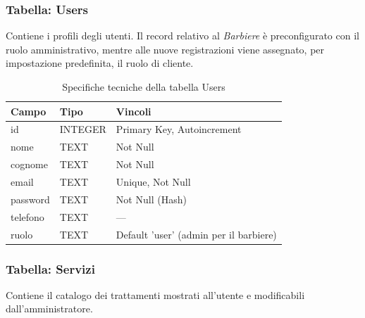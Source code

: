 \documentclass[12pt,a4paper]{article}
\begin{document}
\subsubsection{Tabella: Users}
Contiene i profili degli utenti. Il record relativo al \textit{Barbiere} è preconfigurato con il ruolo amministrativo, mentre alle nuove registrazioni viene assegnato, per impostazione predefinita, il ruolo di cliente.

\begin{table}[h]
\centering

\vspace{1cm}

\begin{tabular}{lll} %
    \toprule
    \textbf{Campo} & \textbf{Tipo} & \textbf{Vincoli} \\ 
    \midrule
    id             & INTEGER       & Primary Key, Autoincrement \\ 
    nome           & TEXT          & Not Null \\ 
    cognome        & TEXT          & Not Null \\ 
    email          & TEXT          & Unique, Not Null \\ 
    password       & TEXT          & Not Null (Hash) \\
    telefono       & TEXT          & --- \\ 
    ruolo          & TEXT          & Default 'user' (admin per il barbiere) \\ 
    \bottomrule
\end{tabular}
\caption{Specifiche tecniche della tabella Users}
\end{table}


\subsubsection{Tabella: Servizi}
Contiene il catalogo dei trattamenti mostrati all'utente e modificabili dall'amministratore.
\end{document}
